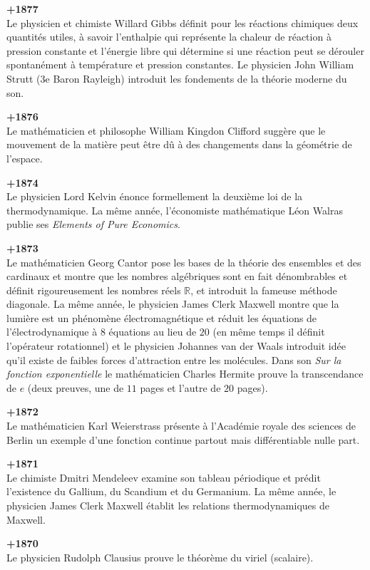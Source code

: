 \textbf{+1877}\\
Le physicien et chimiste Willard Gibbs définit pour les réactions chimiques deux quantités utiles, à savoir l'enthalpie qui représente la chaleur de réaction à pression constante et l'énergie libre qui détermine si une réaction peut se dérouler spontanément à température et pression constantes. Le physicien John William Strutt (3e Baron Rayleigh) introduit les fondements de la théorie moderne du son. 

\textbf{+1876}\\
Le mathématicien et philosophe William Kingdon Clifford suggère que le mouvement de la matière peut être dû à des changements dans la géométrie de l'espace.

\textbf{+1874}\\
Le physicien Lord Kelvin énonce formellement la deuxième loi de la thermodynamique. La même année, l'économiste mathématique Léon Walras publie ses \textit{Elements of Pure Economics}.

\textbf{+1873}\\
Le mathématicien Georg Cantor pose les bases de la théorie des ensembles et des cardinaux et montre que les nombres algébriques sont en fait dénombrables et définit rigoureusement les nombres réels $\mathbb{R}$, et introduit la fameuse méthode diagonale. La même année, le physicien James Clerk Maxwell montre que la lumière est un phénomène électromagnétique et réduit les équations de l'électrodynamique à $8$ équations au lieu de $20$ (en même temps il définit l'opérateur rotationnel) et le physicien Johannes van der Waals introduit idée qu'il existe de faibles forces d'attraction entre les molécules. Dans son \textit{Sur la fonction exponentielle} le mathématicien Charles Hermite prouve la transcendance de $e$ (deux preuves, une de $11$ pages et l'autre de $20$ pages).

\textbf{+1872}\\
Le mathématicien Karl Weierstrass présente à l'Académie royale des sciences de Berlin un exemple d'une fonction continue partout mais différentiable nulle part.

\textbf{+1871}\\
Le chimiste Dmitri Mendeleev examine son tableau périodique et prédit l'existence du Gallium, du Scandium et du Germanium. La même année, le physicien James Clerk Maxwell établit les relations thermodynamiques de Maxwell.

\textbf{+1870}\\
Le physicien Rudolph Clausius prouve le théorème du viriel (scalaire).

